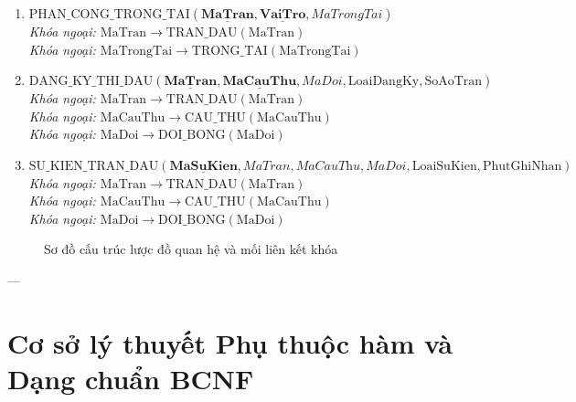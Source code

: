 \begin{enumerate}
    \item $\text{PHAN\_CONG\_TRONG\_TAI}(\underline{\mathbf{MaTran}}, \underline{\mathbf{VaiTro}}, \textit{MaTrongTai})$\\
    \textit{Khóa ngoại: $\text{MaTran} \rightarrow \text{TRAN\_DAU}(\text{MaTran})$}\\
    \textit{Khóa ngoại: $\text{MaTrongTai} \rightarrow \text{TRONG\_TAI}(\text{MaTrongTai})$}
    
    \item $\text{DANG\_KY\_THI\_DAU}(\underline{\mathbf{MaTran}}, \underline{\mathbf{MaCauThu}}, \textit{MaDoi}, \text{LoaiDangKy}, \text{SoAoTran})$\\
    \textit{Khóa ngoại: $\text{MaTran} \rightarrow \text{TRAN\_DAU}(\text{MaTran})$}\\
    \textit{Khóa ngoại: $\text{MaCauThu} \rightarrow \text{CAU\_THU}(\text{MaCauThu})$}\\
    \textit{Khóa ngoại: $\text{MaDoi} \rightarrow \text{DOI\_BONG}(\text{MaDoi})$}
    
    \item $\text{SU\_KIEN\_TRAN\_DAU}(\underline{\mathbf{MaSuKien}}, \textit{MaTran}, \textit{MaCauThu}, \textit{MaDoi}, \text{LoaiSuKien}, \text{PhutGhiNhan})$\\
    \textit{Khóa ngoại: $\text{MaTran} \rightarrow \text{TRAN\_DAU}(\text{MaTran})$}\\
    \textit{Khóa ngoại: $\text{MaCauThu} \rightarrow \text{CAU\_THU}(\text{MaCauThu})$}\\
    \textit{Khóa ngoại: $\text{MaDoi} \rightarrow \text{DOI\_BONG}(\text{MaDoi})$}
\end{enumerate}

\begin{figure}[H]
    \centering
    \caption{Sơ đồ cấu trúc lược đồ quan hệ và mối liên kết khóa}
    \label{fig:relational_diagram}
\end{figure}

---

\section{Cơ sở lý thuyết Phụ thuộc hàm và Dạng chuẩn BCNF}

